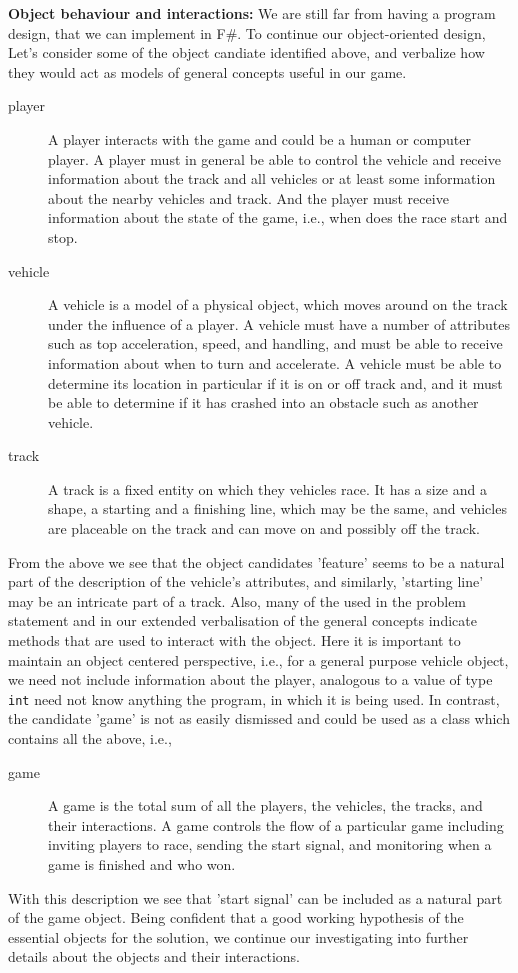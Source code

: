 \textbf{Object behaviour and interactions:} We are still far from having a program design, that we can implement in F\#. To continue our object-oriented design, Let's consider some of the object candiate identified above, and verbalize how they would act as models of general concepts useful in our game.
\begin{description}
\item[player] A player interacts with the game and could be a human or computer player. A player must in general be able to control the vehicle and receive information about the track and all vehicles or at least some information about the nearby vehicles and track. And the player must receive information about the state of the game, i.e., when does the race start and stop.
\item[vehicle] A vehicle is a model of a physical object, which moves around on the track under the influence of a player. A vehicle must have a number of attributes such as top acceleration, speed, and handling, and must be able to receive information about when to turn and accelerate. A vehicle must be able to determine its location in particular if it is on or off track and, and it must be able to determine if it has crashed into an obstacle such as another vehicle.
\item[track] A track is a fixed entity on which they vehicles race. It has a size and a shape, a starting and a finishing line, which may be the same, and vehicles are placeable on the track and can move on and possibly off the track.
\end{description}
From the above we see that the object candidates 'feature' seems to be a natural part of the description of the vehicle's attributes, and similarly, 'starting line' may be an intricate part of a track. Also, many of the  used in the problem statement and in our extended verbalisation of the general concepts indicate methods that are used to interact with the object. Here it is important to maintain an object centered perspective, i.e., for a general purpose vehicle object, we need not include information about the player, analogous to a value of type \lstinline|int| need not know anything the program, in which it is being used. In contrast, the candidate 'game' is not as easily dismissed and could be used as a class which contains all the above, i.e.,
\begin{description}
\item[game] A game is the total sum of all the players, the vehicles, the tracks, and their interactions. A game controls the flow of a particular game including inviting players to race, sending the start signal, and monitoring when a game is finished and who won.
\end{description}
With this description we see that 'start signal' can be included as a natural part of the game object. Being confident that a good working hypothesis of the essential objects for the solution, we continue our investigating into further details about the objects and their interactions.

